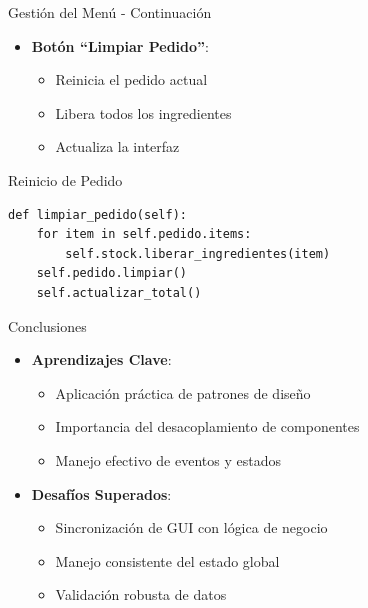 \documentclass[12pt]{beamer}
\begin{document}
\begin{frame}[fragile]{Gestión del Menú - Continuación}
    \begin{itemize}
        \item \textbf{Botón ``Limpiar Pedido''}:
        \begin{itemize}
            \item Reinicia el pedido actual
            \item Libera todos los ingredientes
            \item Actualiza la interfaz
        \end{itemize}
    \end{itemize}
    \begin{exampleblock}{Reinicio de Pedido}
        \begin{verbatim}
def limpiar_pedido(self):
    for item in self.pedido.items:
        self.stock.liberar_ingredientes(item)
    self.pedido.limpiar()
    self.actualizar_total()
        \end{verbatim}
    \end{exampleblock}
\end{frame}

\begin{frame}{Conclusiones}
    \begin{itemize}
        \item \textbf{Aprendizajes Clave}:
        \begin{itemize}
            \item Aplicación práctica de patrones de diseño
            \item Importancia del desacoplamiento de componentes
            \item Manejo efectivo de eventos y estados
        \end{itemize}
        \vspace{0.5cm}
        \item \textbf{Desafíos Superados}:
        \begin{itemize}
            \item Sincronización de GUI con lógica de negocio
            \item Manejo consistente del estado global
            \item Validación robusta de datos
        \end{itemize}
    \end{itemize}
\end{frame}
\end{document}
